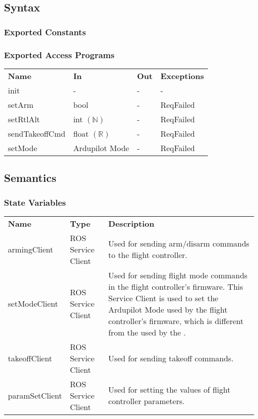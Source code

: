 \documentclass[12pt, titlepage]{article}
\begin{document}
\subsection{Syntax}
\subsubsection{Exported Constants}
\subsubsection{Exported Access Programs}
\begin{center}
\begin{tabular}{p{3.5cm} p{2.5cm} p{2.5cm} p{5cm}}
\hline
\textbf{Name} & \textbf{In} & \textbf{Out} & \textbf{Exceptions} \\
init & - & - & - \\
setArm & bool & - & ReqFailed \\
setRtlAlt & int $(\mathbb{N})$ & - & ReqFailed \\
sendTakeoffCmd & float $(\mathbb{R})$ & - & ReqFailed \\
setMode & Ardupilot Mode & - & ReqFailed \\
\hline
\hline
\end{tabular}
\end{center}
\subsection{Semantics}
\subsubsection{State Variables}
\begin{center}
\begin{tabular}{p{3 cm} p{4cm} p{9cm} }
\hline
\textbf{Name} & \textbf{Type} & \textbf{Description}  \\
armingClient & ROS Service Client & Used for sending arm/disarm commands to the flight controller. \\
setModeClient & ROS Service Client & Used for sending flight mode commands in the flight controller's firmware. This Service Client is used to set the Ardupilot Mode used by the flight controller's firmware, which is different from the \nameref{Operation States} used by the \nameref{Operations Manager}.  \\
takeoffClient & ROS Service Client & Used for sending takeoff commands. \\
paramSetClient & ROS Service Client & Used for setting the values of flight controller parameters. \\
\hline
\hline
\end{tabular}
\end{center}
\end{document}
